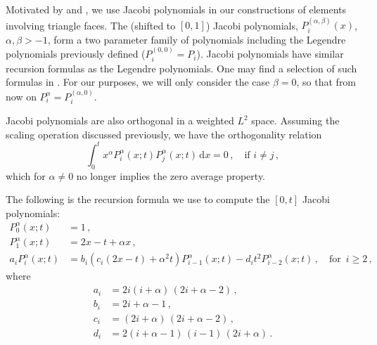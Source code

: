 Motivated by \citet{Beuchler_Schoeberl_06} and \citet{Beuchler_Pillwein_07}, we use Jacobi polynomials in our constructions of elements involving triangle faces.
The (shifted to $[0,1]$) Jacobi polynomials, $P^{(\alpha,\beta)}_i(x)$, $\alpha,\beta>-1$, form a two parameter family of polynomials including the Legendre polynomials previously defined ($P_i^{(0,0)} = P_i$). %
Jacobi polynomials have similar recursion formulas as the Legendre polynomials.
One may find a selection of such formulas in \citet{Beuchler_Pillwein_07}.
For our purposes, we will only consider the case $\beta=0$, so that from now on $P_i^\alpha=P_i^{(\alpha,0)}$.

Jacobi polynomials are also orthogonal in a weighted $L^2$ space. Assuming the scaling operation discussed previously, we have the orthogonality relation
\begin{equation}
	\int_{0}^{t} x^\alpha P_i^\alpha(x;t)P_j^\alpha(x;t)\,\mathrm{d}x=0\,, \quad \text{if } i\neq j\,,
\end{equation}
which for $\alpha\neq0$ no longer implies the zero average property.

The following is the recursion formula we use to compute the $[0,t]$ Jacobi polynomials:
\begin{equation}
	\begin{aligned}
		P_0^\alpha(x;t) &= 1\,, \\
		P_1^\alpha(x;t) &= 2x-t+\alpha x\,,\\
		a_i {P}_i^\alpha(x;t) &= b_i \left( c_i(2x-t) + \alpha^2 t \right) P_{i-1}^\alpha(x;t) - d_i t^2 P_{i-2}^\alpha(x;t)\,,
		\quad \text{for }\, i\geq2\, ,
	\end{aligned}
\label{eq:RecursionJacobi}
\end{equation}
where
\begin{equation*}
	\begin{aligned}
		a_i &=  2i(i+\alpha)\, (2i + \alpha - 2)\,,\\
		b_i &=  2i + \alpha - 1\,,\\
		c_i &=  (2i+\alpha)\, (2i + \alpha - 2)\,,\\
		d_i &=  2(i+\alpha-1)\, (i-1)\, (2i+\alpha)\,.
	\end{aligned}
\end{equation*}

